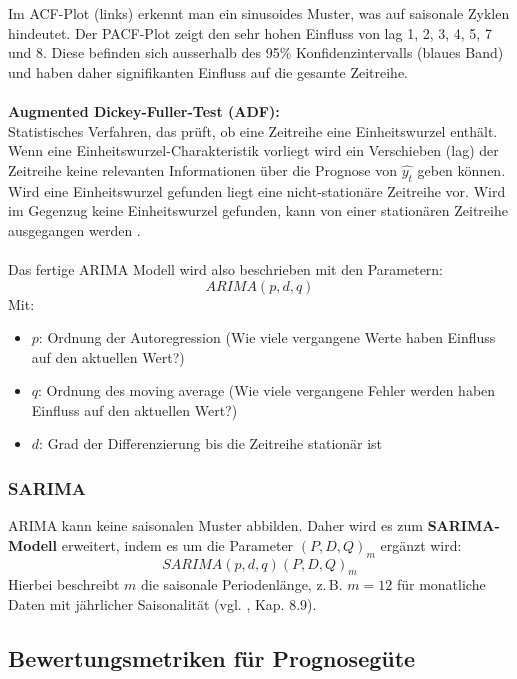 Im ACF-Plot (links) erkennt man ein sinusoides Muster, was auf saisonale Zyklen hindeutet. Der PACF-Plot zeigt den sehr hohen Einfluss von lag 1, 2, 3, 4, 5, 7 und 8. Diese befinden sich ausserhalb des 95\% Konfidenzintervalls (blaues Band) und haben daher signifikanten Einfluss auf die gesamte Zeitreihe. \\
\\\textbf{Augmented Dickey-Fuller-Test (ADF):}\\
Statistisches Verfahren, das prüft, ob eine Zeitreihe eine Einheitswurzel enthält. Wenn eine Einheitswurzel-Charakteristik vorliegt wird ein Verschieben (lag) der Zeitreihe keine relevanten Informationen über die Prognose von $\hat{y_t}$ geben können. Wird eine Einheitswurzel gefunden liegt eine nicht-stationäre Zeitreihe vor. Wird im Gegenzug keine Einheitswurzel gefunden, kann von einer stationären Zeitreihe ausgegangen werden \cite{kwiatkowski1992}.\\
\\Das fertige ARIMA Modell wird also beschrieben mit den Parametern:
\begin{equation}
    ARIMA(p,d,q)
\end{equation}
Mit:
\begin{itemize}
    \item $p$: Ordnung der Autoregression (Wie viele vergangene Werte haben Einfluss auf den aktuellen Wert?)
    \item $q$: Ordnung des moving average (Wie viele vergangene Fehler werden haben Einfluss auf den aktuellen Wert?)
    \item $d$: Grad der Differenzierung bis die Zeitreihe stationär ist
\end{itemize}


\subsubsection{SARIMA}
ARIMA kann keine saisonalen Muster abbilden. Daher wird es zum \textbf{SARIMA-Modell} erweitert, indem es um die Parameter $(P, D, Q)_m$ ergänzt wird:
\begin{equation}
SARIMA(p,d,q)(P,D,Q)_m
\end{equation}
Hierbei beschreibt $m$ die saisonale Periodenlänge, z.\,B. $m=12$ für monatliche Daten mit jährlicher Saisonalität (vgl. \citeauthor{hyndman2018} \citeyear{hyndman2018}, Kap. 8.9).


\subsection{Bewertungsmetriken für Prognosegüte}
\label{subsec:metriken}

